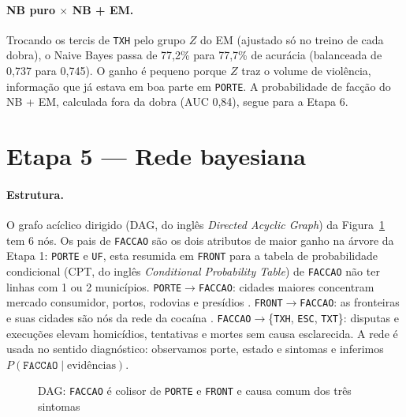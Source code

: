 \documentclass[article,12pt,oneside,a4paper,brazil,sumario=tradicional]{abntex2}
\newcommand{\F}{\texttt{FACCAO}}
\newcommand{\fonteautores}{\fonte{Elaborada pelos autores (2026).}}
\begin{document}
\paragraph{NB puro $\times$ NB + EM.} Trocando os tercis de \texttt{TXH} pelo grupo $Z$ do
EM (ajustado só no treino de cada dobra), o Naive Bayes passa de 77,2\% para 77,7\% de
acurácia (balanceada de 0,737 para 0,745). O ganho é pequeno porque $Z$ traz o volume de
violência, informação que já estava em boa parte em \texttt{PORTE}. A probabilidade de
facção do NB + EM, calculada fora da dobra (AUC 0,84), segue para a Etapa 6.

\section{Etapa 5 --- Rede bayesiana}

\paragraph{Estrutura.} O grafo acíclico dirigido (DAG, do inglês \emph{Directed Acyclic
Graph}) da Figura~\ref{fig:dag} tem 6 nós. Os pais de \F{} são os dois atributos de maior
ganho na árvore da Etapa 1: \texttt{PORTE} e \texttt{UF}, esta resumida em \texttt{FRONT}
para a tabela de probabilidade condicional (CPT, do inglês \emph{Conditional Probability
Table}) de \F{} não ter linhas com 1 ou 2 municípios. \texttt{PORTE}$\to$\F:
cidades maiores concentram mercado consumidor, portos, rodovias e presídios \cite{r10}.
\texttt{FRONT}$\to$\F: as fronteiras e suas cidades são nós da rede da cocaína \cite{r11}.
\F$\to$\{\texttt{TXH}, \texttt{ESC}, \texttt{TXT}\}: disputas e execuções elevam
homicídios, tentativas e mortes sem causa esclarecida. A rede é usada no sentido
diagnóstico: observamos porte, estado e sintomas e inferimos $P(\F\mid\text{evidências})$.

\begin{figure}[htbp]
\centering
\caption{DAG: \F{} é colisor de \texttt{PORTE} e \texttt{FRONT} e causa comum dos três
sintomas}\label{fig:dag}
\fonteautores
\end{figure}
\end{document}
